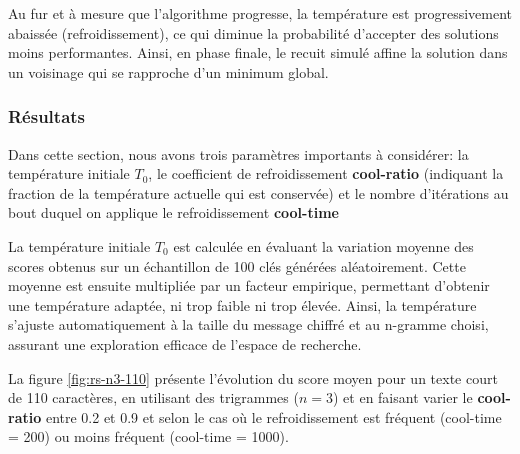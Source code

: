 \documentclass[a4paper]{article}
\begin{document}
Au fur et à mesure que l'algorithme progresse, la température est progressivement abaissée (refroidissement), ce qui diminue la probabilité d'accepter des solutions moins performantes. Ainsi, en phase finale, le recuit simulé affine la solution dans un voisinage qui se rapproche d'un minimum global.


\subsubsection{Résultats}

Dans cette section, nous avons trois paramètres importants à considérer: la température initiale $T_0$, le coefficient de refroidissement \textbf{cool-ratio} (indiquant la fraction de la température actuelle qui est conservée) et le nombre d'itérations au bout duquel on applique le refroidissement \textbf{cool-time}

La température initiale $T_0$ est calculée en évaluant la variation moyenne des scores obtenus sur un échantillon de 100 clés générées aléatoirement. Cette moyenne est ensuite multipliée par un facteur empirique, permettant d'obtenir une température adaptée, ni trop faible ni trop élevée. 
Ainsi, la température s'ajuste automatiquement à la taille du message chiffré et au n-gramme choisi, assurant une exploration efficace de l'espace de recherche.


La figure \ref{fig:rs-n3-110} présente l'évolution du score moyen pour un
texte court de 110 caractères, en utilisant des trigrammes ($n=3$) et en faisant varier le \textbf{cool-ratio} entre 0.2 et 0.9 et selon le cas où le refroidissement est fréquent (cool-time = 200) ou moins fréquent (cool-time = 1000).
\end{document}
